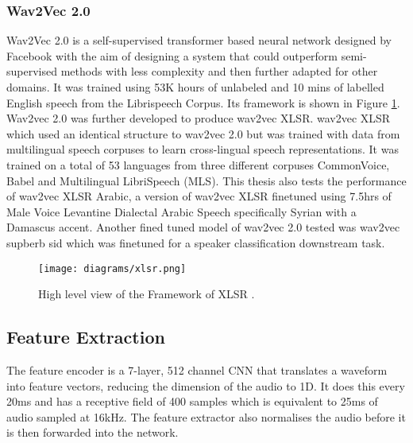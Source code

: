 \subsubsection{Wav2Vec 2.0}
Wav2Vec 2.0 \cite{baevski_wav2vec_2020} is a self-supervised transformer based neural network designed by Facebook with the aim of designing a system 
that could outperform semi-supervised methods with less complexity and then further adapted for other domains.  
It was trained using 53K hours of unlabeled and 10 mins of labelled English speech from the Librispeech Corpus. 
Its framework is shown in Figure \ref{fig:figxlsr}. 
Wav2vec 2.0 was further developed to produce wav2vec XLSR. wav2vec XLSR \cite{babu_xls-r_2021} which used an identical structure to wav2vec 2.0
but was trained with data from multilingual speech corpuses to learn cross-lingual speech representations.  
It was trained on a total of 53 languages from three different corpuses CommonVoice, Babel and Multilingual LibriSpeech (MLS). 
This thesis also tests the performance of wav2vec XLSR Arabic, a version of wav2vec XLSR finetuned using 7.5hrs of Male Voice Levantine Dialectal Arabic Speech specifically 
Syrian with a Damascus accent. Another fined tuned model of wav2vec 2.0 tested was wav2vec supberb sid which was finetuned for a speaker classification downstream task. 

\begin{figure}[h!]
    \centering
    \texttt{[image: diagrams/xlsr.png]}
    \caption{High level view of the Framework of XLSR \cite{babu_xls-r_2021}.}
    \label{fig:figxlsr}
\end{figure}

\subsection{Feature Extraction}

The feature encoder is a 7-layer, 512 channel CNN that translates a waveform into feature vectors, reducing the dimension of the audio 
to 1D. It does this every 20ms and has a receptive field of 400 samples which is equivalent to 25ms of audio sampled at 16kHz. The feature 
extractor also normalises the audio before it is then forwarded into the network. 



